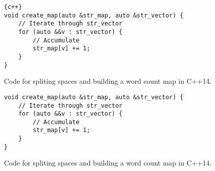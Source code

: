 \begin{figure}[tbh!]
\begin{lstlisting}{c++}
void create_map(auto &str_map, auto &str_vector) {
    // Iterate through str_vector
    for (auto &&v : str_vector) {
        // Accumulate
        str_map[v] += 1;
    }
}
\end{lstlisting}
\caption[Code of Wordcount with Listing]
{Code for spliting spaces and building a word count map in C++14.}
\label{fig:code_wordcount}
\end{figure}

\begin{figure}[tbh!]
\begin{verbatim}
void create_map(auto &str_map, auto &str_vector) {
    // Iterate through str_vector
    for (auto &&v : str_vector) {
        // Accumulate
        str_map[v] += 1;
    }
}
\end{verbatim}
\caption[Code of Wordcount with Minted]
{Code for spliting spaces and building a word count map in C++14.}
\label{fig:code_wordcount_minted}
\end{figure}

